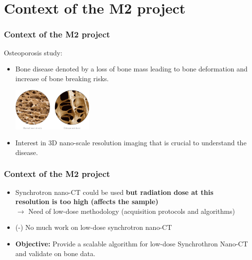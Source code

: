\documentclass{beamer}
\begin{document}
\section{Context of the M2 project}
\begin{frame}
	\frametitle{Context of the M2 project}
	Osteoporosis study:
	

	\begin{itemize}
		\item Bone disease denoted by a loss of bone mass leading to bone deformation and increase of bone breaking risks.
		\begin{center}
			\includegraphics[width=4cm]{bone.png}		
		\end{center}
		\item Interest in 3D nano-scale resolution imaging that is crucial to understand the disease.
		
  		
	\end{itemize}
	
	\frametitle{Context of the M2 project}
	

\end{frame}

\begin{frame}

\begin{itemize}
		\item Synchrotron nano-CT could be used \textbf{but radiation dose at
this resolution is too high (affects the sample)}\\
  $ \rightarrow $ Need of low-dose methodology (acquisition protocols and algorithms)
  		\item (-) No much work on low-dose synchrotron nano-CT
  		\item \textbf{Objective:} Provide a scalable algorithm for low-dose Synchrothron Nano-CT and validate on bone data.
\end{itemize}

\end{frame}
\end{document}
